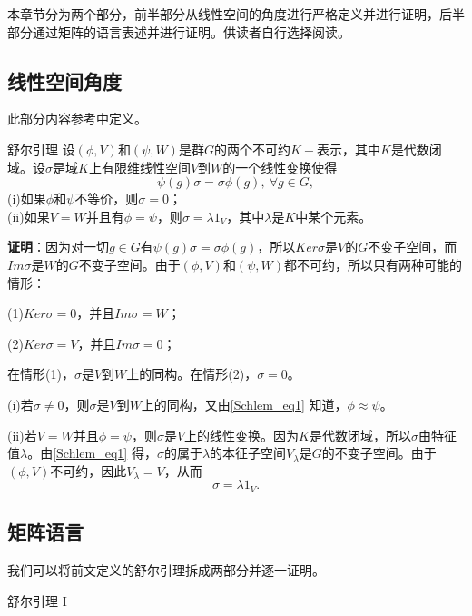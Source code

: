 

本章节分为两个部分，前半部分从线性空间的角度进行严格定义并进行证明，后半部分通过矩阵的语言表述并进行证明。供读者自行选择阅读。

\subsection{线性空间角度}

此部分内容参考\cite{维声表示}中定义。

\begin{lemma}{舒尔引理}
设$(\phi,V)$和$(\psi,W)$是群$G$的两个不可约$K-$表示，其中$K$是代数闭域。设$\sigma$是域$K$上有限维线性空间$V$到$W$的一个线性变换使得
\begin{equation}\label{Schlem_eq1}
\psi(g)\sigma =\sigma \phi(g),~\forall g \in G,
\end{equation}
(i)如果$\phi$和$\psi$不等价，则$\sigma=0$； \\
(ii)如果$V=W$并且有$\phi=\psi$，则$\sigma=\lambda1_V$，其中$\lambda$是$K$中某个元素。
\end{lemma}

\textbf{证明}：因为对一切$g\in G$有$\psi(g)\sigma =\sigma \phi(g)$，所以$Ker\sigma $是$V$的$G$不变子空间，而$Im\sigma$是$W$的$G$不变子空间。由于$(\phi,V)$和$(\psi,W)$都不可约，所以只有两种可能的情形：

(1)$Ker\sigma =0$，并且$Im\sigma=W$；

(2)$Ker\sigma =V$，并且$Im\sigma=0$；

在情形(1)，$\sigma $是$V$到$W$上的同构。在情形(2)，$\sigma=0$。

(i)若$\sigma \neq 0$，则$\sigma$是$V$到$W$上的同构，又由\autoref{Schlem_eq1} 知道，$\phi \approx \psi$。

(ii)若$V=W$并且$\phi=\psi$，则$\sigma$是$V$上的线性变换。因为$K$是代数闭域，所以$\sigma$由特征值$\lambda$。由\autoref{Schlem_eq1} 得，$\sigma$的属于$\lambda$的本征子空间$V_\lambda$是$G$的不变子空间。由于$(\phi,V)$不可约，因此$V_\lambda=V$，从而
\begin{equation}
\sigma=\lambda1_V.
\end{equation}

\subsection{矩阵语言}

我们可以将前文定义的舒尔引理拆成两部分并逐一证明。

\begin{lemma}{舒尔引理 I}

\end{lemma}